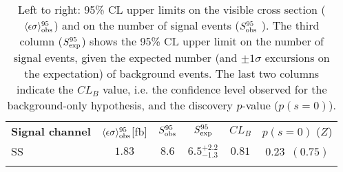 
\begin{table}
\centering
\setlength{\tabcolsep}{0.0pc}
\begin{tabular*}{\textwidth}{@{\extracolsep{\fill}}lccccc}
\noalign{\smallskip}\hline\noalign{\smallskip}
{\bf Signal channel}                        & $\langle\epsilon{\rm \sigma}\rangle_{\rm obs}^{95}$[fb]  &  $S_{\rm obs}^{95}$  & $S_{\rm exp}^{95}$ & $CL_{B}$ & $p(s=0)$ ($Z$)  \\
\noalign{\smallskip}\hline\noalign{\smallskip}
 SS    & $1.83$ &  $8.6$ & $ { 6.5 }^{ +2.2 }_{ -1.3 }$ & $0.81$ & $ 0.23$~$(0.75)$ \\%
\noalign{\smallskip}\hline\noalign{\smallskip}
\end{tabular*}
\caption[Breakdown of upper limits.]{
Left to right: 95\% CL upper limits on the visible cross section
($\langle\epsilon\sigma\rangle_{\rm obs}^{95}$) and on the number of
signal events ($S_{\rm obs}^{95}$ ).  The third column
($S_{\rm exp}^{95}$) shows the 95\% CL upper limit on the number of
signal events, given the expected number (and $\pm 1\sigma$
excursions on the expectation) of background events.
The last two columns
indicate the $CL_B$ value, i.e. the confidence level observed for
the background-only hypothesis, and the discovery $p$-value ($p(s = 0)$). 
\label{table.results.exclxsec.pval.upperlimit.SS}}
\end{table}
%